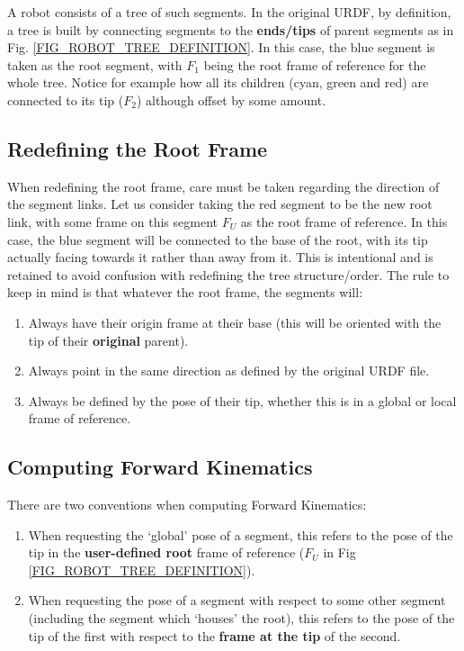 \documentclass[12pt,a4paper,onecolumn]{article}
\begin{document}
\noindent A robot consists of a tree of such segments. In the original URDF, by definition, a tree is built by connecting segments to the \textbf{ends/tips} of parent segments as in Fig. \ref{FIG_ROBOT_TREE_DEFINITION}. In this case, the blue segment is taken as the root segment, with $F_1$ being the root frame of reference for the whole tree. Notice for example how all its children (cyan, green and red) are connected to its tip ($F_2$) although offset by some amount.

\subsection{Redefining the Root Frame}
When redefining the root frame, care must be taken regarding the direction of the segment links. Let us consider taking the red segment to be the new root link, with some frame on this segment $F_U$ as the root frame of reference. In this case, the blue segment will be connected to the base of the root, with its tip actually facing towards it rather than away from it. This is intentional and is retained to avoid confusion with redefining the tree structure/order. The rule to keep in mind is that whatever the root frame, the segments will:
\begin{enumerate}
\item Always have their origin frame at their base (this will be oriented with the tip of their \textbf{original} parent).
\item Always point in the same direction as defined by the original URDF file.
\item Always be defined by the pose of their tip, whether this is in a global or local frame of reference.
\end{enumerate}

\subsection{Computing Forward Kinematics}
There are two conventions when computing Forward Kinematics:
\begin{enumerate}
\item When requesting the `global' pose of a segment, this refers to the pose of the tip in the \textbf{user-defined root} frame of reference ($F_U$ in Fig \ref{FIG_ROBOT_TREE_DEFINITION}).
\item When requesting the pose of a segment with respect to some other segment (including the segment which `houses' the root), this refers to the pose of the tip of the first with respect to the \textbf{frame at the tip} of the second.
\end{enumerate}
\end{document}
